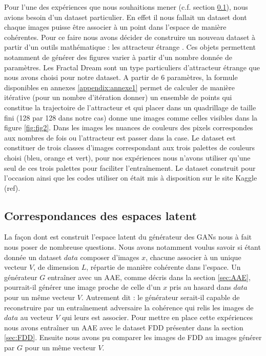 \documentclass[11pt,francais]{article}
\begin{document}
Pour l'une des expériences que nous souhaitions mener (c.f. section \ref{sec:CorrespondancesLS}), nous avions besoin d'un dataset particulier.
En effet il nous fallait un dataset dont chaque images puisse être associer à un point dans l'espace de manière cohérentes.
Pour ce faire nous avons décider de construire un nouveau dataset à partir d'un outils mathématique : les attracteur étrange \cite{Pickover}. Ces objets permettent notamment de générer des figures varier à partir d'un nombre donnée de paramètres.
Les Fractal Dream \cite{Pickover} sont un type particuliers d'attracteur étrange que nous avons choisi pour notre dataset. A partir de 6 paramètres, la formule disponibles en annexes \ref{appendix:annexe1} permet de calculer de manière itérative (pour un nombre d'itération donner) un ensemble de points qui constitue la trajectoire de l'attracteur et qui placer dans un quadrillage de taille fini (128 par 128 dans notre cas) donne une images comme celles visibles dans la figure \ref{fig:fig2}. Dans les images les nuances de couleurs des pixels correspondes aux nombres de fois ou l'attracteur est passer dans la case.
Le dataset est constituer de trois classes d'images correspondant aux trois palettes de couleurs choisi (bleu, orange et vert), pour nos expériences nous n'avons utiliser qu'une seul de ces trois palettes pour faciliter l'entraînement.
Le dataset construit pour l'occasion ainsi que les codes utiliser on était mis à disposition sur le site Kaggle (ref).

\subsection{Correspondances des espaces latent}
\label{sec:CorrespondancesLS}
La façon dont est construit l'espace latent du générateur des GANs nous à fait nous poser de nombreuse questions.
Nous avons notamment voulus savoir si étant donnée un dataset \(data\) composer d'images \(x\), chacune associer à un unique vecteur \(V\), de dimension \(L\), répartie de manière cohérente dans l'espace. Un générateur \(G\) entraîner avec un AAE, comme décris dans la section \ref{sec:AAE}, pourrait-il générer une image proche de celle d'un \(x\) pris au hasard dans \(data\) pour un même vecteur \(V\). Autrement dit : le générateur serait-il capable de reconstruire par un entraînement adversaire la cohérence qui relis les images de \(data\) au vecteur \(V\) qui leurs est associer. 
Pour mettre en place cette expériences nous avons entraîner un AAE avec le dataset FDD présenter dans la section \ref{sec:FDD}. Ensuite nous avons pu comparer les images de FDD au images générer par \(G\) pour un même vecteur \(V\).
\end{document}
